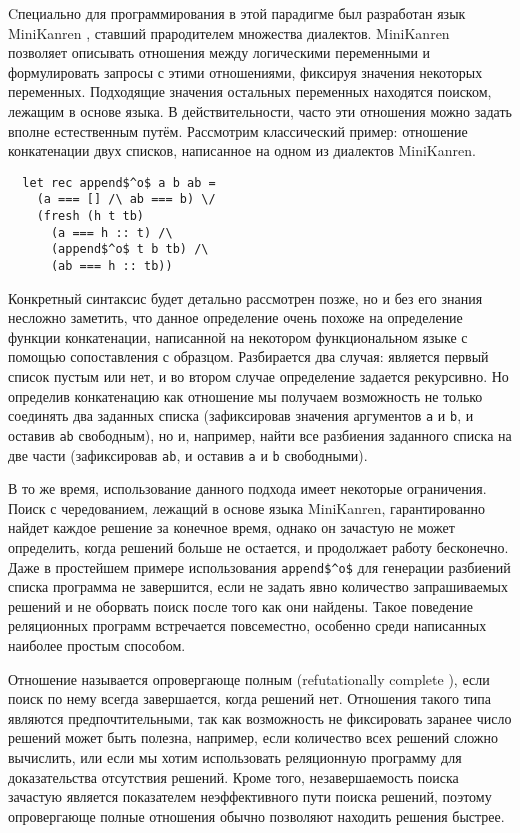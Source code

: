     Cпециально для программирования в этой парадигме был разработан язык MiniKanren \cite{TRS}, ставший прародителем множества диалектов. MiniKanren позволяет описывать отношения между логическими переменными и формулировать запросы с этими отношениями, фиксируя значения некоторых переменных. Подходящие значения остальных переменных находятся поиском, лежащим в основе языка. В действительности, часто эти отношения можно задать вполне естественным путём. Рассмотрим классический пример: отношение конкатенации двух списков, написанное на одном из диалектов MiniKanren.

\begin{lstlisting}
  let rec append$^o$ a b ab =
    (a === [] /\ ab === b) \/
    (fresh (h t tb)
      (a === h :: t) /\
      (append$^o$ t b tb) /\
      (ab === h :: tb))
\end{lstlisting}

    Конкретный синтаксис будет детально рассмотрен позже, но и без его знания несложно заметить, что данное определение очень похоже на определение функции конкатенации, написанной на некотором функциональном языке с помощью сопоставления с образцом. Разбирается два случая: является первый список пустым или нет, и во втором случае определение задается рекурсивно. Но определив конкатенацию как отношение мы получаем возможность не только соединять два заданных списка (зафиксировав значения аргументов \lstinline|a| и \lstinline|b|, и оставив \lstinline|ab| свободным), но и, например, найти все разбиения заданного списка на две части (зафиксировав \lstinline|ab|, и оставив \lstinline|a| и \lstinline|b| свободными).

    В то же время, использование данного подхода имеет некоторые ограничения. Поиск с чередованием, лежащий в основе языка MiniKanren, гарантированно найдет каждое решение за конечное время, однако он зачастую не может определить, когда решений больше не остается, и продолжает работу бесконечно. Даже в простейшем примере использования \lstinline|append$^o$| для генерации разбиений списка программа не завершится, если не задать явно количество запрашиваемых решений и не оборвать поиск после того как они найдены. Такое поведение реляционных программ встречается повсеместно, особенно среди написанных наиболее простым способом.

    Отношение называется опровергающе полным (refutationally complete \cite{WillThesis}), если поиск по нему всегда завершается, когда решений нет. Отношения такого типа являются предпочтительными, так как возможность не фиксировать заранее число решений может быть полезна, например, если количество всех решений сложно вычислить, или если мы хотим использовать реляционную программу для доказательства отсутствия решений. Кроме того, незавершаемость поиска зачастую является показателем неэффективного пути поиска решений, поэтому опровергающе полные отношения обычно позволяют находить решения быстрее.

